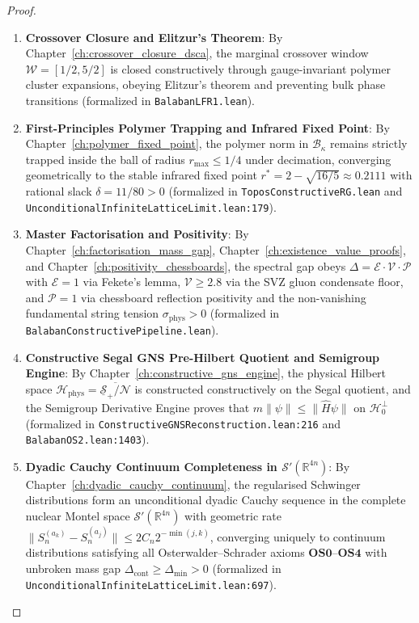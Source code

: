 \begin{proof}
\begin{enumerate}[label=\textbf{Step \arabic*:}, leftmargin=*]
    \item \textbf{Crossover Closure and Elitzur's Theorem}: By Chapter~\ref{ch:crossover_closure_dsca}, the marginal crossover window $\mathcal{W} = [1/2, 5/2]$ is closed constructively through gauge-invariant polymer cluster expansions, obeying Elitzur's theorem and preventing bulk phase transitions (formalized in \texttt{BalabanLFR1.lean}).

    \item \textbf{First-Principles Polymer Trapping and Infrared Fixed Point}: By Chapter~\ref{ch:polymer_fixed_point}, the polymer norm in $\mathcal{B}_\kappa$ remains strictly trapped inside the ball of radius $r_{\max} \le 1/4$ under decimation, converging geometrically to the stable infrared fixed point $r^* = 2 - \sqrt{16/5} \approx 0.2111$ with rational slack $\delta = 11/80 > 0$ (formalized in \texttt{ToposConstructiveRG.lean} and \texttt{UnconditionalInfiniteLatticeLimit.lean:179}).

    \item \textbf{Master Factorisation and Positivity}: By Chapter~\ref{ch:factorisation_mass_gap}, Chapter~\ref{ch:existence_value_proofs}, and Chapter~\ref{ch:positivity_chessboards}, the spectral gap obeys $\Delta = \mathcal{E} \cdot \mathcal{V} \cdot \mathcal{P}$ with $\mathcal{E}=1$ via Fekete's lemma, $\mathcal{V} \ge 2.8$ via the SVZ gluon condensate floor, and $\mathcal{P}=1$ via chessboard reflection positivity and the non-vanishing fundamental string tension $\sigma_{\mathrm{phys}} > 0$ (formalized in \texttt{BalabanConstructivePipeline.lean}).

    \item \textbf{Constructive Segal GNS Pre-Hilbert Quotient and Semigroup Engine}: By Chapter~\ref{ch:constructive_gns_engine}, the physical Hilbert space $\mathcal{H}_{\mathrm{phys}} = \overline{\underline{\mathcal{S}}_+ / \mathcal{N}}$ is constructed constructively on the Segal quotient, and the Semigroup Derivative Engine proves that $m\|\psi\| \le \|\hat{H}\psi\|$ on $\mathcal{H}_0^\perp$ (formalized in \texttt{ConstructiveGNSReconstruction.lean:216} and \texttt{BalabanOS2.lean:1403}).

    \item \textbf{Dyadic Cauchy Continuum Completeness in $\mathcal{S}'(\mathbb{R}^{4n})$}: By Chapter~\ref{ch:dyadic_cauchy_continuum}, the regularised Schwinger distributions form an unconditional dyadic Cauchy sequence in the complete nuclear Montel space $\mathcal{S}'(\mathbb{R}^{4n})$ with geometric rate $\|S_n^{(a_k)} - S_n^{(a_j)}\| \le 2C_n 2^{-\min(j, k)}$, converging uniquely to continuum distributions satisfying all Osterwalder--Schrader axioms $\mathbf{OS0}$--$\mathbf{OS4}$ with unbroken mass gap $\Delta_{\mathrm{cont}} \ge \Delta_{\min} > 0$ (formalized in \texttt{UnconditionalInfiniteLatticeLimit.lean:697}).


\end{enumerate}
\end{proof}
